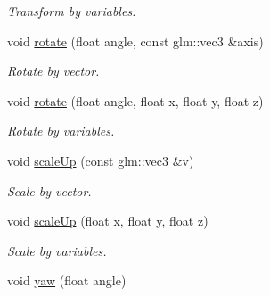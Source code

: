 \begin{DoxyCompactItemize}
\begin{DoxyCompactList}\small\item\em Transform by variables. \end{DoxyCompactList}\item 
\hypertarget{class_transform_component_a54f3f0e7924028bb32279aac3938a149}{void \hyperlink{class_transform_component_a54f3f0e7924028bb32279aac3938a149}{rotate} (float angle, const glm\+::vec3 \&axis)}\label{class_transform_component_a54f3f0e7924028bb32279aac3938a149}

\begin{DoxyCompactList}\small\item\em Rotate by vector. \end{DoxyCompactList}\item 
\hypertarget{class_transform_component_a7c97e7f1e9924b811319acb73accde72}{void \hyperlink{class_transform_component_a7c97e7f1e9924b811319acb73accde72}{rotate} (float angle, float x, float y, float z)}\label{class_transform_component_a7c97e7f1e9924b811319acb73accde72}

\begin{DoxyCompactList}\small\item\em Rotate by variables. \end{DoxyCompactList}\item 
\hypertarget{class_transform_component_a45483b2f5f38819ad0db6fcfe0f0ded8}{void \hyperlink{class_transform_component_a45483b2f5f38819ad0db6fcfe0f0ded8}{scale\+Up} (const glm\+::vec3 \&v)}\label{class_transform_component_a45483b2f5f38819ad0db6fcfe0f0ded8}

\begin{DoxyCompactList}\small\item\em Scale by vector. \end{DoxyCompactList}\item 
\hypertarget{class_transform_component_a161374892f674b2e6d34bcaeb66a2a28}{void \hyperlink{class_transform_component_a161374892f674b2e6d34bcaeb66a2a28}{scale\+Up} (float x, float y, float z)}\label{class_transform_component_a161374892f674b2e6d34bcaeb66a2a28}

\begin{DoxyCompactList}\small\item\em Scale by variables. \end{DoxyCompactList}\item 
\hypertarget{class_transform_component_ae32c6f3f18b81fc712629fb689d61252}{void \hyperlink{class_transform_component_ae32c6f3f18b81fc712629fb689d61252}{yaw} (float angle)}\label{class_transform_component_ae32c6f3f18b81fc712629fb689d61252}


\end{DoxyCompactItemize}
